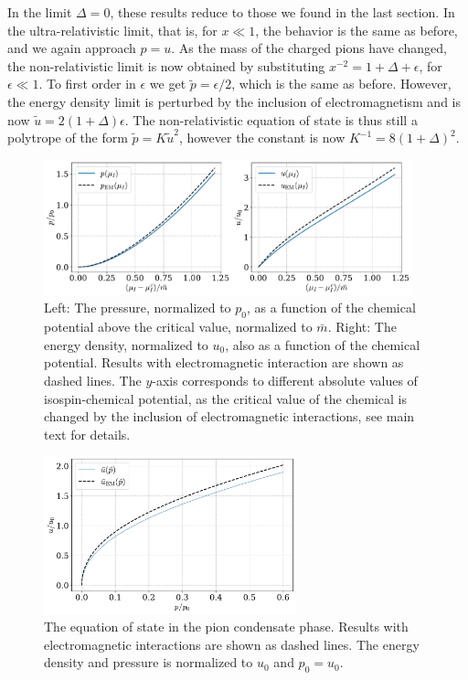 %
In the limit $\Delta = 0$, these results reduce to those we found in the last section.
In the ultra-relativistic limit, that is, for  $x \ll 1$, the behavior is the same as before, and we again approach $p = u$.
As the mass of the charged pions have changed, the non-relativistic limit is now obtained by substituting $x^{-2} = 1 + \Delta + \epsilon$, for $\epsilon \ll 1$.
To first order in $\epsilon$ we get $\tilde p = \epsilon / 2$, which is the same as before.
However, the energy density limit is perturbed by the inclusion of electromagnetism and is now $\tilde u = 2(1 + \Delta) \epsilon$.
The non-relativistic equation of state is thus still a polytrope of the form $\tilde p = K \tilde u^2$, however the constant is now $K^{-1} = 8 (1+\Delta)^2$.


\begin{figure}[!htb]
    \centering
    \includegraphics[width=0.95\textwidth]{../scripts/figurer/pion_star/pion_up.pdf}
    \caption{
        Left: The pressure, normalized to $p_0$, as a function of the chemical potential above the critical value, normalized to $\bar m$.
        Right: The energy density, normalized to $u_0$, also as a function of the chemical potential.
        Results with electromagnetic interaction are shown as dashed lines.
        The $y$-axis corresponds to different absolute values of isospin-chemical potential, as the critical value of the chemical is changed by the inclusion of electromagnetic interactions, see main text for details.
        }
        \label{fig: pressure and energy with EM interaction}
\end{figure}



\begin{figure}[!htb]
    \centering
    \includegraphics[width=0.65\textwidth]{../scripts/figurer/pion_star/pion_eos_EM.pdf}
    \caption{
        The equation of state in the pion condensate phase. 
        Results with electromagnetic interactions are shown as dashed lines.
        The energy density and pressure is normalized to $u_0$ and $p_0 = u_0$.
        }
    \label{fig: eos chpt em interaction}
\end{figure}





